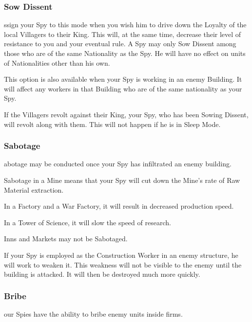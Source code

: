 \subsubsection{\textsf{Sow Dissent}}


ssign your Spy to this mode when you wish him to drive down the Loyalty of the local Villagers to their King. This will, at the same time, decrease their level of resistance to you and your eventual rule. A Spy may only Sow Dissent among those who are of the same Nationality as the Spy. He will have no effect on units of Nationalities other than his own.

This option is also available when your Spy is working in an enemy Building. It will affect any workers in that Building who are of the same nationality as your Spy.

If the Villagers revolt against their King, your Spy, who has been Sowing Dissent, will revolt along with them. This will not happen if he is in Sleep Mode.

\subsubsection{\textsf{Sabotage}}


abotage may be conducted once your Spy has infiltrated an enemy building.

Sabotage in a Mine means that your Spy will cut down the Mine’s rate of Raw Material extraction.

In a Factory and a War Factory, it will result in decreased production speed.

In a Tower of Science, it will slow the speed of research.

Inns and Markets may not be Sabotaged.

If your Spy is employed as the Construction Worker in an enemy structure, he will work to weaken it. This weakness will not be visible to the enemy until the building is attacked. It will then be destroyed much more quickly.

\subsubsection{\textsf{Bribe}}


our Spies have the ability to bribe enemy units inside firms.

